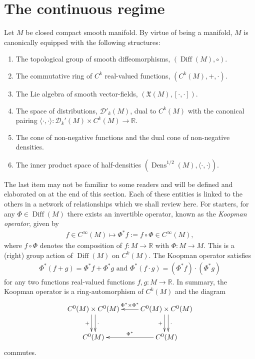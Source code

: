\documentclass[12pt]{amsart}
\newcommand{\R}{\ensuremath{\mathbb{R}}}
\DeclareMathOperator{\Diff}{Diff}
\DeclareMathOperator{\Dens}{Dens}
\begin{document}
\section{The continuous regime}
\label{sec:continuous}
Let $M$ be closed compact smooth manifold.
By virtue of being a manifold, $M$ is canonically equipped with the following structures:
\begin{enumerate}
	\item The topological group of smooth diffeomorphisms, $(\Diff(M), \circ)$.
	\item The commutative ring of $C^k$ real-valued functions, $(C^k(M), + , \cdot)$.
	\item The Lie algebra of smooth vector-fields, $(\mathfrak{X}(M) , [ \cdot , \cdot ])$.
	\item The space of distributions, $\mathcal{D}'_k(M)$, dual to $C^k(M)$
	with the canonical pairing $\langle \cdot , \cdot \rangle : \mathcal{D}_k'(M) \times C^k(M) \to \R$.
	\item The cone of non-negative functions and the dual cone of non-negative densities.
	\item The inner product space of half-densities $(\Dens^{1/2}(M), \langle \cdot , \cdot \rangle)$.
\end{enumerate}
The last item may not be familiar to some readers and will be defined and elaborated on at the end of this section.
Each of these entities is linked to the others in a network of relationships
which we shall review here.
For starters, for any $\Phi \in \Diff(M)$ there exists an invertible operator, known as the \emph{Koopman operator}, given by
\begin{align*}
	f \in C^\infty(M) \mapsto \Phi^* f := f \circ \Phi \in C^\infty(M),
\end{align*}
where $f \circ \Phi$ denotes the composition of $f:M \to \R$ with $\Phi:M \to M$.
This is a (right) group action of $\Diff(M)$ on $C^k(M)$.
The Koopman operator satisfies
\begin{align*}
	\Phi^*(f+g) = \Phi^*f + \Phi^*g \text{ and } \Phi^*(f\cdot g) = (\Phi^*f) \cdot (\Phi^*g)
\end{align*}
for any two functions real-valued functions $f,g: M \to \mathbb{R}$.
In summary, the Koopman operator is a ring-automorphism of $C^k(M)$
and the diagram
\begin{equation}
	\xymatrix{
		C^0(M) \times C^0(M)  \ar@<-0.6ex>[d]_{+} \ar@<0.6ex>[d]^{\cdot} & \ar[l]_{\Phi^* \times \Phi^*} C^0(M) \times C^0(M)  \ar@<-0.6ex>[d]_{+} \ar@<0.6ex>[d]^{\cdot} \\
		C^0(M)  & \ar[l]_{\Phi^*} C^0(M)
	}
\end{equation}
commutes.
\end{document}
